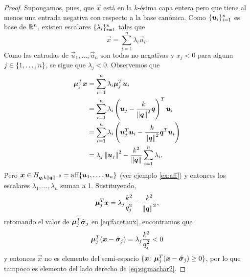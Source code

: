 \begin{proof}
	Supongamos, pues, que $\vec{x}$ está en la $k$-ésima capa entera pero que tiene al menos una
	entrada negativa con respecto a la base canónica. Como $\lbrace \boldsymbol{u}_i \rbrace_{i=1}^{n}$ es base de
	$\mathbb{R}^n$, existen escalares $\lbrace \lambda_i \rbrace_{i=1}^{n}$ tales que
	\begin{equation*}
		\vec{x} = \sum_{i=1}^{n}\lambda_i\vec{u}_i.
	\end{equation*}
	Como las entradas de $\vec{u}_1, \ldots, \vec{u}_n$ son todas no negativas y $x_j < 0$ para
	alguna $j \in \lbrace 1, \ldots, n \rbrace$, se sigue que $\lambda_j < 0$. Observemos que
	\begin{align*}
		\boldsymbol{\mu}_j^T\boldsymbol{x}
		&=
		\sum_{i=1}^{n}\lambda_i\boldsymbol{\mu}_j^T\boldsymbol{u}_i \\
		&=
		\sum_{i=1}^{n}\lambda_i\left(\boldsymbol{u}_j - \frac{k}{\left\lVert \boldsymbol{q} \right\rVert^2}\boldsymbol{q}\right)^T\boldsymbol{u}_i \\
		&=
		\sum_{i=1}^{n}\lambda_i\left(\boldsymbol{u}_j^T\boldsymbol{u}_i -
			\frac{k}{\left\lVert \boldsymbol{q} \right\rVert^2}\boldsymbol{q}^T\boldsymbol{u}_i\right) \\
		&=
		\lambda_j\left\lVert \boldsymbol{u}_j \right\rVert^2 - \frac{k^2}{\left\lVert \boldsymbol{q} \right\rVert} \sum_{i=1}^{n}\lambda_i.
	\end{align*}
	Pero $\boldsymbol{x} \in H_{\boldsymbol{q}, k\left\lVert \boldsymbol{q} \right\rVert^{-2}} = \operatorname{aff}\lbrace \boldsymbol{u}_1, \ldots, \boldsymbol{u}_n \rbrace$
	(ver ejemplo \ref{ex:aff}) y entonces los escalares $\lambda_1, \ldots, \lambda_n$ suman a 1.
	Sustituyendo,
	\begin{equation*}
		\boldsymbol{\mu}_j^T\boldsymbol{x} = \lambda_j\frac{k^2}{q_j^2} - \frac{k^2}{\left\lVert \boldsymbol{q} \right\rVert^2},
	\end{equation*}
	retomando el valor de $\boldsymbol{\mu}_j^T\hat{\boldsymbol{ \sigma }}_j$ en \eqref{eq:facetaux}, encontramos que
	\begin{equation*}
		\boldsymbol{\mu}_j^T(\boldsymbol{x} - \hat{\boldsymbol{ \sigma }}_j) = \lambda_j\frac{k^2}{q_j^2} < 0
	\end{equation*}
	y entonces $\vec{x}$ no es elemento del semi-espacio $\lbrace \boldsymbol{x} \colon
	\boldsymbol{\mu}_j^T(\boldsymbol{x} - \hat{\boldsymbol{ \sigma }}_j) \geq 0 \rbrace$, por lo que tampoco es elemento del lado
	derecho de \eqref{eq:sigmachar2}.
\end{proof}

